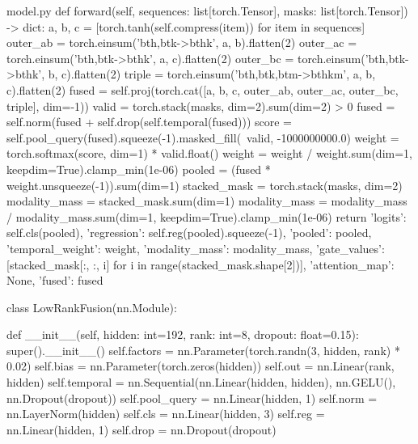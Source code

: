 \documentclass[bwprint]{gmcmthesis}
\begin{document}
\begin{appendices}
\begin{Python}{model.py}
    def forward(self, sequences: list[torch.Tensor], masks: list[torch.Tensor]) -> dict:
        a, b, c = [torch.tanh(self.compress(item)) for item in sequences]
        outer_ab = torch.einsum('bth,btk->bthk', a, b).flatten(2)
        outer_ac = torch.einsum('bth,btk->bthk', a, c).flatten(2)
        outer_bc = torch.einsum('bth,btk->bthk', b, c).flatten(2)
        triple = torch.einsum('bth,btk,btm->bthkm', a, b, c).flatten(2)
        fused = self.proj(torch.cat([a, b, c, outer_ab, outer_ac, outer_bc, triple], dim=-1))
        valid = torch.stack(masks, dim=2).sum(dim=2) > 0
        fused = self.norm(fused + self.drop(self.temporal(fused)))
        score = self.pool_query(fused).squeeze(-1).masked_fill(~valid, -1000000000.0)
        weight = torch.softmax(score, dim=1) * valid.float()
        weight = weight / weight.sum(dim=1, keepdim=True).clamp_min(1e-06)
        pooled = (fused * weight.unsqueeze(-1)).sum(dim=1)
        stacked_mask = torch.stack(masks, dim=2)
        modality_mass = stacked_mask.sum(dim=1)
        modality_mass = modality_mass / modality_mass.sum(dim=1, keepdim=True).clamp_min(1e-06)
        return {'logits': self.cls(pooled), 'regression': self.reg(pooled).squeeze(-1), 'pooled': pooled, 'temporal_weight': weight, 'modality_mass': modality_mass, 'gate_values': [stacked_mask[:, :, i] for i in range(stacked_mask.shape[2])], 'attention_map': None, 'fused': fused}

class LowRankFusion(nn.Module):

    def __init__(self, hidden: int=192, rank: int=8, dropout: float=0.15):
        super().__init__()
        self.factors = nn.Parameter(torch.randn(3, hidden, rank) * 0.02)
        self.bias = nn.Parameter(torch.zeros(hidden))
        self.out = nn.Linear(rank, hidden)
        self.temporal = nn.Sequential(nn.Linear(hidden, hidden), nn.GELU(), nn.Dropout(dropout))
        self.pool_query = nn.Linear(hidden, 1)
        self.norm = nn.LayerNorm(hidden)
        self.cls = nn.Linear(hidden, 3)
        self.reg = nn.Linear(hidden, 1)
        self.drop = nn.Dropout(dropout)


\end{Python}
\end{appendices}
\end{document}
